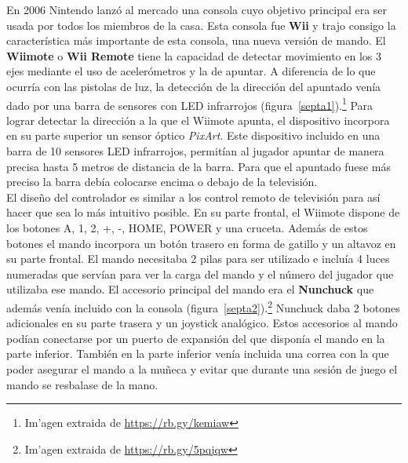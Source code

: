 En 2006 Nintendo lanz\'o al mercado una consola cuyo objetivo principal era ser usada por todos los miembros de la casa. Esta consola fue \textbf{Wii} y trajo consigo la caracter\'istica m\'as importante de esta consola, una nueva versi\'on de mando. El \textbf{Wiimote} o \textbf{Wii Remote} tiene la capacidad de detectar movimiento en los 3 ejes mediante el uso de aceler\'ometros y la de apuntar. A diferencia de lo que ocurr\'ia con las pistolas de luz, la detecci\'on de la direcci\'on del apuntado ven\'ia dado por una barra de sensores con LED infrarrojos (figura~\ref{septa1}).\footnote{Im'agen extraida de \url{https://rb.gy/kemiaw}} Para lograr detectar la direcci\'on a la que el Wiimote apunta, el dispositivo incorpora en su parte superior un sensor \'optico \textit{PixArt}. Este dispositivo incluido en una barra de 10 sensores LED infrarrojos, permit\'ian al jugador apuntar de manera precisa hasta 5 metros de distancia de la barra. Para que el apuntado fuese m\'as preciso la barra deb\'ia colocarse encima o debajo de la televisi\'on.\\

El dise\~no del controlador es similar a los control remoto de televisi\'on para as\'i hacer que sea lo m\'as intuitivo posible. En su parte frontal, el Wiimote dispone de los botones A, 1, 2, +, -, HOME, POWER y una cruceta. Adem\'as de estos botones el mando incorpora un bot\'on trasero en forma de gatillo y un altavoz en su parte frontal. El mando necesitaba 2 pilas para ser utilizado e inclu\'ia 4 luces numeradas que serv\'ian para ver la carga del mando y el n\'umero del jugador que utilizaba ese mando. El accesorio principal del mando era el \textbf{Nunchuck} que adem\'as ven\'ia incluido con la consola (figura~\ref{septa2}).\footnote{Im'agen extraida de \url{https://rb.gy/5pqjqw}} Nunchuck daba 2 botones adicionales en su parte trasera y un joystick anal\'ogico. Estos accesorios al mando pod\'ian conectarse por un puerto de expansi\'on del que dispon\'ia el mando en la parte inferior. Tambi\'en en la parte inferior ven\'ia incluida una correa con la que poder asegurar el mando a la mu\~neca y evitar que durante una sesi\'on de juego el mando se resbalase de la mano.\\

